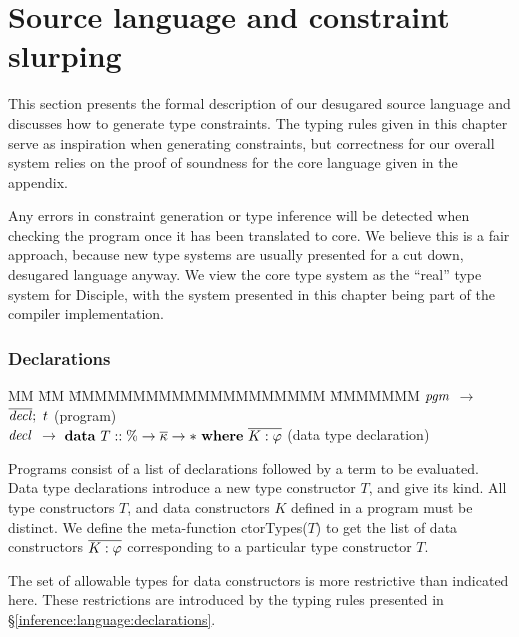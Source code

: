 \clearpage{}
\section{Source language and constraint slurping}
\label{Inference:Language}

This section presents the formal description of our desugared source language and discusses how to generate type constraints. The typing rules given in this chapter serve as inspiration when generating constraints, but correctness for our overall system relies on the proof of soundness for the core language given in the appendix.

Any errors in constraint generation or type inference will be detected when checking the program once it has been translated to core. We believe this is a fair approach, because new type systems are usually presented for a cut down, desugared language anyway. We view the core type system as the ``real'' type system for Disciple, with the system presented in this chapter being part of the compiler implementation. 


\bigskip
\bigskip
\subsubsection{Declarations}
\vspace{-1ex}
\begin{tabbing}
MM 	\= MM \= MMMMMMMMMMMMMMMMMMMM \= MMMMMMM \kill
$\operatorname{\mathit{pgm}}$	\>   $\to$	\> $\overline{\operatorname{\mathit{decl}}}; \ t$						\> (program)		\\[1ex]
$\operatorname{\mathit{decl}}$ 
	\>   $\to$ 	\> $\textrm{\textbf{data}} \ T :: \% \to \overline{\kappa} \to * \ \textrm{\textbf{where}} \ \overline{K : \varphi}$ 
			\> (data type declaration)
\end{tabbing}

Programs consist of a list of declarations followed by a term to be evaluated. Data type declarations introduce a new type constructor $T$, and give its kind. All type constructors $T$, and data constructors $K$ defined in a program must be distinct. We define the meta-function ctorTypes($T$) to get the list of data constructors $\overline{K : \varphi}$ corresponding to a particular type constructor $T$.

The set of allowable types for data constructors is more restrictive than indicated here. These restrictions are introduced by the typing rules presented in \S\ref{inference:language:declarations}.



\bigskip
\bigskip
